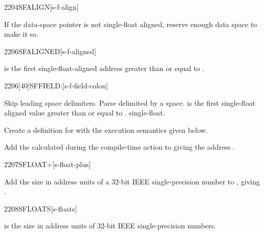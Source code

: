 \begin{worddef}{2204}{SFALIGN}[s-f-align]
\item \stack{}{}

	If the data-space pointer is not single-float aligned, reserve
	enough data space to make it so.

\end{worddef}


\begin{worddef}{2206}{SFALIGNED}[s-f-aligned]
\item {}

	 is the first single-float-aligned address greater
	than or equal to .

\end{worddef}


\begin{worddef}{2206}[40]{SFFIELD:}[s-f-field-colon]%
\item {}

	Skip leading space delimiters. Parse  delimited by
	a space.  is the first single-float aligned value
	greater than or equal to .  
	single-float.

	Create a definition for  with the execution semantics
	given below.

\execute[name]

	Add the  calculated during the compile-time action to
	 giving the address .

\end{worddef}


\begin{worddef}{2207}{SFLOAT+}[s-float-plus]
\item {}

	Add the size in address units of a 32-bit IEEE single-precision
	number to , giving .

\end{worddef}


\begin{worddef}{2208}{SFLOATS}[s-floats]
\item {}

	 is the size in address units of  32-bit IEEE
	single-precision numbers.

\end{worddef}
